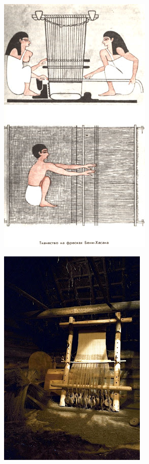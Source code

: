 \begin{multicols}{2}
\vfill
\pagebreak

\begin{center}
	\includegraphics[height=.9\textheight]{./IMG/tear-egito.jpg}
\end{center}

\null
\columnbreak

\begin{center}
	\includegraphics[height=.9\textheight]{./IMG/tear-europa.jpg}
\end{center}


\end{multicols}
